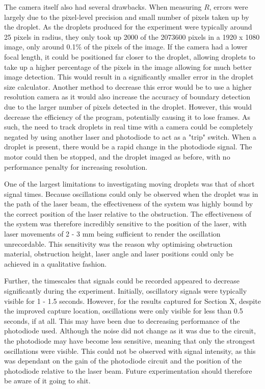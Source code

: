 \documentclass{physics_article_B}
\begin{document}
    The camera itself also had several drawbacks. When measuring $R$, errors were largely due to the pixel-level precision and small number of pixels taken up by the droplet. As the droplets produced for the experiment were typically around 25 pixels in radius, they only took up 2000 of the 2073600 pixels in a 1920 x 1080 image, only around 0.1\% of the pixels of the image. If the camera had a lower focal length, it could be positioned far closer to the droplet, allowing droplets to take up a higher percentage of the pixels in the image allowing for much better image detection. This would result in a significantly smaller error in the droplet size calculator. Another method to decrease this error would be to use a higher resolution camera as it would also increase the accuracy of boundary detection due to the larger number of pixels detected in the droplet. However, this would decrease the efficiency of the program, potentially causing it to lose frames. As such, the need to track droplets in real time with a camera could be completely negated by using another laser and photodiode to act as a "trip" switch. When a droplet is present, there would be a rapid change in the photodiode signal. The motor could then be stopped, and the droplet imaged as before, with no performance penalty for increasing resolution.
    
    One of the largest limitations to investigating moving droplets was that of short signal times. Because oscillations could only be observed when the droplet was in the path of the laser beam, the effectiveness of the system was highly bound by the correct position of the laser relative to the obstruction. The effectiveness of the system was therefore incredibly sensitive to the position of the laser, with laser movements of 2 - 3 mm being sufficient to render the oscillation unrecordable. This sensitivity was the reason why optimising obstruction material, obstruction height, laser angle and laser positions could only be achieved in a qualitative fashion. 
    
    Further, the timescales that signals could be recorded appeared to decrease significantly during the experiment. Initially, oscillatory signals were typically visible for 1 - 1.5 seconds. However, for the results captured for Section X, despite the improved capture location, oscillations were only visible for less than 0.5 seconds, if at all. This may have been due to decreasing performance of the photodiode used. Although the noise did not change as it was due to the circuit, the photodiode may have become less sensitive, meaning that only the strongest oscillations were visible. This could not be observed with signal intensity, as this was dependant on the gain of the photodiode circuit and the position of the photodiode relative to the laser beam. Future experimentation should therefore be aware of it going to shit.  
    
\end{document}

